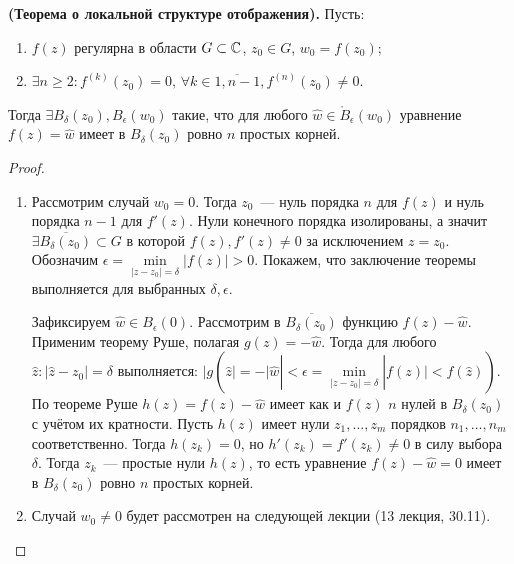 
\begin{statement}
\textbf{(Теорема о локальной структуре отображения).} Пусть:
\begin{enumerate}[wide=20pt, itemsep=0ex]
\item \(f(z)\) регулярна в области \(G \subset \mathbb{C}\), \(z_0 \in G\), \(w_0 = f(z_0)\);
\item \(\exists n \ge 2\colon f^{(k)}(z_0) = 0,\, \forall k \in \overline{1, n-1}, f^{(n)}(z_0) \ne
0\).
\end{enumerate}
Тогда \(\exists B_\delta(z_0), B_\epsilon(w_0)\) такие, что для любого \(\hat{w} \in \mathring{B}_
\epsilon(w_0)\) уравнение \(f(z) = \hat{w}\) имеет в \(B_\delta(z_0)\) ровно \(n\) простых корней.
\end{statement}

\begin{proof}
\begin{enumerate}[wide=20pt, itemsep=0ex]
\item Рассмотрим случай \(w_0 = 0\). Тогда \(z_0\)~--- нуль порядка \(n\) для \(f(z)\) и нуль
    порядка \(n-1\) для \(f'(z)\). Нули конечного порядка изолированы, а значит \(\exists 
    \overline{B_\delta(z_0)} \subset G\) в которой \(f(z), f'(z) \ne 0\) за исключением \(z = z_0\).
    Обозначим \(\epsilon = \min\limits_{|z - z_0| = \delta} |f(z)| > 0\). Покажем, что заключение
    теоремы выполняется для выбранных \(\delta, \epsilon\).

    Зафиксируем \(\hat{w} \in B_\epsilon (0)\). Рассмотрим в \(\overline{B_\delta (z_0)}\) функцию
    \(f(z) - \hat{w}\). Применим теорему Руше, полагая \(g(z) = - \hat{w}\). Тогда для любого
    \(\hat{z}\colon |\hat{z} - z_0| = \delta\) выполняется: \(|g(\hat{z}| = -|\hat{w}| < \epsilon =
    \min\limits_{|z - z_0| = \delta} |f(z)| < f(\hat{z}))\). По теореме Руше \(h(z) = f(z) - 
    \hat{w}\) имеет как и \(f(z)\) \(n\) нулей в \(B_\delta(z_0)\) с учётом их кратности. Пусть
    \(h(z)\) имеет нули \(z_1, \dots, z_m\) порядков \(n_1, \dots, n_m\) соответственно. Тогда 
    \(h(z_k) = 0\), но \(h'(z_k) = f'(z_k) \ne 0\) в силу выбора \(\delta\). Тогда \(z_k\)~---
    простые нули \(h(z)\), то есть уравнение \(f(z) - \hat{w} = 0\) имеет в \(B_\delta(z_0)\) ровно
    \(n\) простых корней.
\item Случай \(w_0 \ne 0\) будет рассмотрен на следующей лекции (13 лекция, 30.11).
\end{enumerate}
\end{proof}

